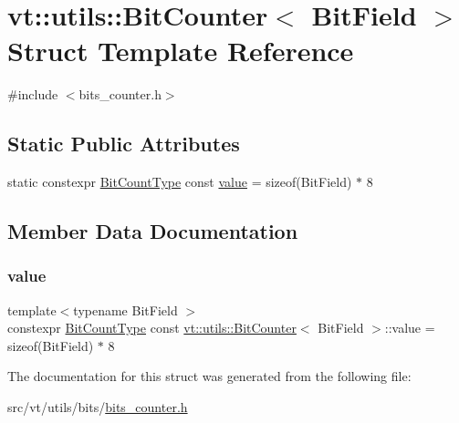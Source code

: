 \hypertarget{structvt_1_1utils_1_1_bit_counter}{}\section{vt\+:\+:utils\+:\+:Bit\+Counter$<$ Bit\+Field $>$ Struct Template Reference}
\label{structvt_1_1utils_1_1_bit_counter}


{\ttfamily \#include $<$bits\+\_\+counter.\+h$>$}

\subsection*{Static Public Attributes}
\begin{DoxyCompactItemize}
\item 
static constexpr \hyperlink{namespacevt_acaf7da00eb37dfb0c3479a6a982c30ef}{Bit\+Count\+Type} const \hyperlink{structvt_1_1utils_1_1_bit_counter_abc52603719e0a6d68f5e73354e98f17c}{value} = sizeof(Bit\+Field) $\ast$ 8
\end{DoxyCompactItemize}


\subsection{Member Data Documentation}
\mbox{\label{structvt_1_1utils_1_1_bit_counter_abc52603719e0a6d68f5e73354e98f17c}} 
\subsubsection{\texorpdfstring{value}{value}}
{\footnotesize\ttfamily template$<$typename Bit\+Field $>$ \\
constexpr \hyperlink{namespacevt_acaf7da00eb37dfb0c3479a6a982c30ef}{Bit\+Count\+Type} const \hyperlink{structvt_1_1utils_1_1_bit_counter}{vt\+::utils\+::\+Bit\+Counter}$<$ Bit\+Field $>$\+::value = sizeof(Bit\+Field) $\ast$ 8\hspace{0.3cm}{\ttfamily [static]}}



The documentation for this struct was generated from the following file\+:\begin{DoxyCompactItemize}
\item 
src/vt/utils/bits/\hyperlink{bits__counter_8h}{bits\+\_\+counter.\+h}\end{DoxyCompactItemize}

